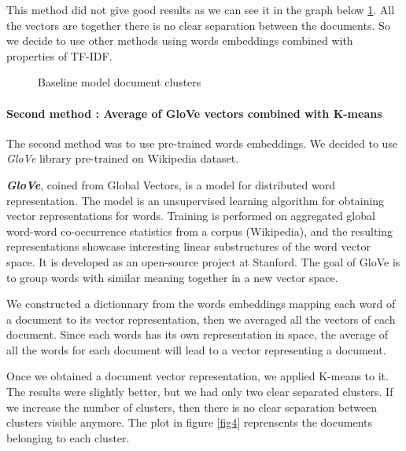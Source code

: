 \documentclass[article,twocolumn]{IEEEtran}
\begin{document}
This method did not give good results as we can see it in the graph
below \ref{fig3}. All the vectors are together there is no clear
separation between the documents. So we decide to use other methods
using words embeddings combined with properties of TF-IDF.


    \begin{figure}
        \begin{center}\end{center}
        \caption{Baseline model document clusters}
        \label{fig3}
    \end{figure}
    
    \hypertarget{second-method-average-of-glove-vectors-combined-with-k-means}{%
\paragraph{Second method : Average of GloVe vectors combined with
K-means}\label{second-method-average-of-glove-vectors-combined-with-k-means}}

The second method was to use pre-trained words embeddings. We decided to
use \emph{GloVe} library pre-trained on Wikipedia dataset.

\textbf{\emph{GloVe}}, coined from Global Vectors, is a model for
distributed word representation. The model is an unsupervised learning
algorithm for obtaining vector representations for words. Training is
performed on aggregated global word-word co-occurrence statistics from a
corpus (Wikipedia), and the resulting representations showcase
interesting linear substructures of the word vector space. It is
developed as an open-source project at Stanford.\cite{GloVe} The goal of
GloVe is to group words with similar meaning together in a new vector
space.

We constructed a dictionnary from the words embeddings mapping each word
of a document to its vector representation, then we averaged all the
vectors of each document. Since each words has its own representation in
space, the average of all the words for each document will lead to a
vector representing a document.

Once we obtained a document vector representation, we applied K-means to
it. The results were slightly better, but we had only two clear
separated clusters. If we increase the number of clusters, then there is
no clear separation between clusters visible anymore. The plot in figure
\ref{fig4} reprensents the documents belonging to each cluster.
\end{document}
